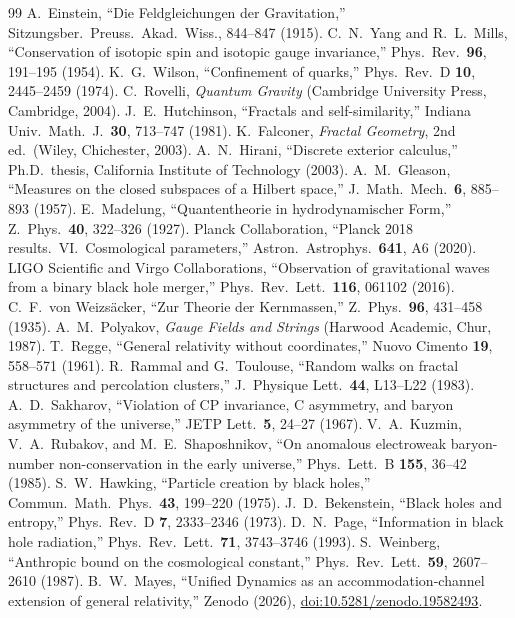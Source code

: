 \documentclass[11pt,twocolumn]{article}
\begin{document}
\begin{thebibliography}{99}
 A.~Einstein, ``Die Feldgleichungen der Gravitation,'' Sitzungsber.\ Preuss.\ Akad.\ Wiss., 844--847 (1915).
 C.~N.~Yang and R.~L.~Mills, ``Conservation of isotopic spin and isotopic gauge invariance,'' Phys.\ Rev.\ \textbf{96}, 191--195 (1954).
 K.~G.~Wilson, ``Confinement of quarks,'' Phys.\ Rev.\ D \textbf{10}, 2445--2459 (1974).
 C.~Rovelli, \textit{Quantum Gravity} (Cambridge University Press, Cambridge, 2004).
 J.~E.~Hutchinson, ``Fractals and self-similarity,'' Indiana Univ.\ Math.\ J.\ \textbf{30}, 713--747 (1981).
 K.~Falconer, \textit{Fractal Geometry}, 2nd ed.\ (Wiley, Chichester, 2003).
 A.~N.~Hirani, ``Discrete exterior calculus,'' Ph.D.\ thesis, California Institute of Technology (2003).
 A.~M.~Gleason, ``Measures on the closed subspaces of a Hilbert space,'' J.\ Math.\ Mech.\ \textbf{6}, 885--893 (1957).
 E.~Madelung, ``Quantentheorie in hydrodynamischer Form,'' Z.\ Phys.\ \textbf{40}, 322--326 (1927).
 Planck Collaboration, ``Planck 2018 results.\ VI.\ Cosmological parameters,'' Astron.\ Astrophys.\ \textbf{641}, A6 (2020).
 LIGO Scientific and Virgo Collaborations, ``Observation of gravitational waves from a binary black hole merger,'' Phys.\ Rev.\ Lett.\ \textbf{116}, 061102 (2016).
 C.~F.~von Weizs\"acker, ``Zur Theorie der Kernmassen,'' Z.\ Phys.\ \textbf{96}, 431--458 (1935).
 A.~M.~Polyakov, \textit{Gauge Fields and Strings} (Harwood Academic, Chur, 1987).
 T.~Regge, ``General relativity without coordinates,'' Nuovo Cimento \textbf{19}, 558--571 (1961).
 R.~Rammal and G.~Toulouse, ``Random walks on fractal structures and percolation clusters,'' J.\ Physique Lett.\ \textbf{44}, L13--L22 (1983).
 A.~D.~Sakharov, ``Violation of CP invariance, C asymmetry, and baryon asymmetry of the universe,'' JETP Lett.\ \textbf{5}, 24--27 (1967).
 V.~A.~Kuzmin, V.~A.~Rubakov, and M.~E.~Shaposhnikov, ``On anomalous electroweak baryon-number non-conservation in the early universe,'' Phys.\ Lett.\ B \textbf{155}, 36--42 (1985).
 S.~W.~Hawking, ``Particle creation by black holes,'' Commun.\ Math.\ Phys.\ \textbf{43}, 199--220 (1975).
 J.~D.~Bekenstein, ``Black holes and entropy,'' Phys.\ Rev.\ D \textbf{7}, 2333--2346 (1973).
 D.~N.~Page, ``Information in black hole radiation,'' Phys.\ Rev.\ Lett.\ \textbf{71}, 3743--3746 (1993).
 S.~Weinberg, ``Anthropic bound on the cosmological constant,'' Phys.\ Rev.\ Lett.\ \textbf{59}, 2607--2610 (1987).
 B.~W.~Mayes, ``Unified Dynamics as an accommodation-channel extension of general relativity,'' Zenodo (2026), \href{https://doi.org/10.5281/zenodo.19582493}{doi:10.5281/zenodo.19582493}.
\end{thebibliography}
\end{document}
